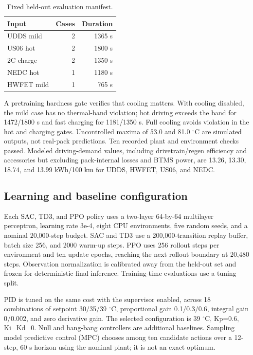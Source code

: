 \documentclass[conference]{IEEEtran}
\begin{document}
\begin{table}[t]
\caption{Fixed held-out evaluation manifest.}
\label{tab:II}
\centering\footnotesize
\begin{tabular}{lrr}
\toprule
Input & Cases & Duration\\
\midrule
UDDS mild & 2 & 1365 s\\
US06 hot & 2 & 1800 s\\
2C charge & 2 & 1350 s\\
NEDC hot & 1 & 1180 s\\
HWFET mild & 1 & 765 s\\
\bottomrule
\end{tabular}
\end{table}
A pretraining hardness gate verifies that cooling matters. With cooling disabled, the mild case has no thermal-band violation; hot driving exceeds the band for 1472/1800 s and fast charging for 1181/1350 s. Full cooling avoids violation in the hot and charging gates. Uncontrolled maxima of 53.0 and 81.0 $^{\circ}$C are simulated outputs, not real-pack predictions. Ten recorded plant and environment checks passed. Modeled driving-demand values, including drivetrain/regen efficiency and accessories but excluding pack-internal losses and BTMS power, are 13.26, 13.30, 18.74, and 13.99 kWh/100 km for UDDS, HWFET, US06, and NEDC.

\subsection{Learning and baseline configuration}
Each SAC, TD3, and PPO policy uses a two-layer 64-by-64 multilayer perceptron, learning rate 3e-4, eight CPU environments, five random seeds, and a nominal 20,000-step budget. SAC and TD3 use a 200,000-transition replay buffer, batch size 256, and 2000 warm-up steps. PPO uses 256 rollout steps per environment and ten update epochs, reaching the next rollout boundary at 20,480 steps. Observation normalization is calibrated away from the held-out set and frozen for deterministic final inference. Training-time evaluations use a tuning split.

PID is tuned on the same cost with the supervisor enabled, across 18 combinations of setpoint 30/35/39 $^{\circ}$C, proportional gain 0.1/0.3/0.6, integral gain 0/0.002, and zero derivative gain. The selected configuration is 39 $^{\circ}$C, Kp=0.6, Ki=Kd=0. Null and bang-bang controllers are additional baselines. Sampling model predictive control (MPC) chooses among ten candidate actions over a 12-step, 60 s horizon using the nominal plant; it is not an exact optimum.
\end{document}
